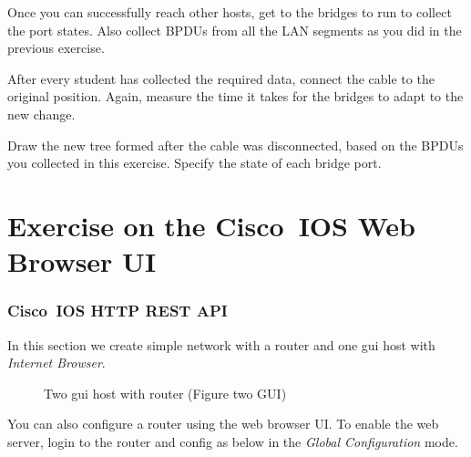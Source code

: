 \documentclass{../UTNetLab}
\begin{document}
    Once you can successfully reach other hosts, get to the bridges to run  to collect the port states.
    Also collect BPDUs from all the LAN segments as you did in the previous exercise.

    After every student has collected the required data, connect the cable to the original position.
    Again, measure the time it takes for the bridges to adapt to the new change.

    \begin{report}
        \item Draw the new tree formed after the cable was disconnected, based on the BPDUs you collected in this exercise.
            Specify the state of each bridge port.
    \end{report}

\part{Exercise on the Cisco~IOS Web Browser UI}
\section{Cisco~IOS HTTP REST API}
    In this section we create simple network with a router and one gui host with \textit{Internet Browser}.

    \begin{figure}[H]
        \centering
        \caption{Two gui host with router (Figure two GUI)}
        \label{fig:two-gui}
    \end{figure}

    You can also configure a router using the web browser UI.
    To enable the web server, login to the router and config as below  in the \textit{Global Configuration} mode.
\end{document}

